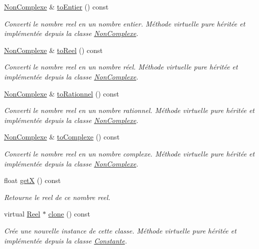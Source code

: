 \begin{DoxyCompactItemize}
\hyperlink{classNonComplexe}{\-Non\-Complexe} \& \hyperlink{classReel_ad9e955b349afd277bf6694aab9d928cf}{to\-Entier} () const 
\begin{DoxyCompactList}\small\item\em \-Converti le nombre reel en un nombre entier. \-Méthode virtuelle pure héritée et implémentée depuis la classe \hyperlink{classNonComplexe}{\-Non\-Complexe}. \end{DoxyCompactList}\item 
\hyperlink{classNonComplexe}{\-Non\-Complexe} \& \hyperlink{classReel_a022e6e5c75053769c7fa4f8e8bfc6fa6}{to\-Reel} () const 
\begin{DoxyCompactList}\small\item\em \-Converti le nombre reel en un nombre réel. \-Méthode virtuelle pure héritée et implémentée depuis la classe \hyperlink{classNonComplexe}{\-Non\-Complexe}. \end{DoxyCompactList}\item 
\hyperlink{classNonComplexe}{\-Non\-Complexe} \& \hyperlink{classReel_ad2c2981a8a9f140efadfef310a1c58fc}{to\-Rationnel} () const 
\begin{DoxyCompactList}\small\item\em \-Converti le nombre reel en un nombre rationnel. \-Méthode virtuelle pure héritée et implémentée depuis la classe \hyperlink{classNonComplexe}{\-Non\-Complexe}. \end{DoxyCompactList}\item 
\hyperlink{classNonComplexe}{\-Non\-Complexe} \& \hyperlink{classReel_ab8195ae116be9eca6cd69b9b03a311ba}{to\-Complexe} () const 
\begin{DoxyCompactList}\small\item\em \-Converti le nombre reel en un nombre complexe. \-Méthode virtuelle pure héritée et implémentée depuis la classe \hyperlink{classNonComplexe}{\-Non\-Complexe}. \end{DoxyCompactList}\item 
float \hyperlink{classReel_a8e0faff44febfaf4d952c6bad91b3a3f}{get\-X} () const 
\begin{DoxyCompactList}\small\item\em \-Retourne le reel de ce nombre reel. \end{DoxyCompactList}\item 
virtual \hyperlink{classReel}{\-Reel} $\ast$ \hyperlink{classReel_ab53c7d10a93c702bd7ccde897fc396df}{clone} () const 
\begin{DoxyCompactList}\small\item\em \-Crée une nouvelle instance de cette classe. \-Méthode virtuelle pure héritée et implémentée depuis la classe \hyperlink{classConstante}{\-Constante}. \end{DoxyCompactList}\item 

\end{DoxyCompactItemize}
